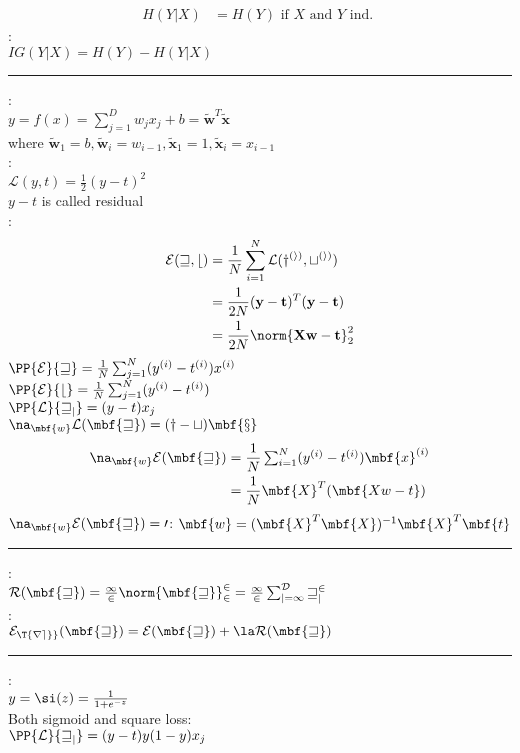 \documentclass[10pt]{CheatSheet/hw}
\begin{document}
\begin{multicols*}{5}
\begin{align*}
    H(Y|X)&=H(Y) \text{ if $X$ and $Y$ ind. }
\end{align*}
:\\ $IG(Y|X)=H(Y)-H(Y|X)$\\
\rule{\linewidth}{0.4pt}
:\\ $y=f(x)=\sum_{j=1}^D w_j x_j + b=\mathbf{\tilde{w}}^T\mathbf{\tilde{x}}$\\ where $\mathbf{\tilde{w}}_1=b,\mathbf{\tilde{w}}_i=w_{i-1}, \mathbf{\tilde{x}}_1=1, \mathbf{\tilde{x}}_i=x_{i-1}$\\
:\\ $\mathcal{L}(y,t)=\frac12(y-t)^2$\\$y-t$ is called residual\\
: \begin{align*}
    \cal{E}(w,b)&=\frac1N\sum_{i=1}^N \cal{L}(y^{(i)}, t^{(i)})\\
    &=\frac1{2N}(\mathbf{y}-\mathbf{t})^T(\mathbf{y}-\mathbf{t})\\
    &=\frac1{2N}\norm{\mathbf{Xw-t}}_2^2
\end{align*}
$\PP{\cal{E}}{w}=\frac1{N}\sum_{j=1}^N (y^{(i)}-t^{(i)})x^{(i)}$\\
$\PP{\cal{E}}{b}=\frac1{N}\sum_{j=1}^N (y^{(i)}-t^{(i)})$\\
$\PP{\cal{L}}{w_j}=(y-t)x_j$\\
$\na_\mbf{w} \cal{L}(\mbf{w}) = (y-t)\mbf{x}$
\begin{align*}
    \na_\mbf{w} \cal{E}(\mbf{w}) &= \frac1N \textstyle\sum_{i=1}^N (y^{(i)}-t^{(i)})\mbf{x}^{(i)}\\
    &= \frac1N \mbf{X}^T(\mbf{Xw-t})
\end{align*}
$\na_\mbf{w} \cal{E}(\mbf{w})=0$: $\mbf{w}=(\mbf{X}^T\mbf{X})^{-1}\mbf{X}^T\mbf{t}$\\
\rule{\linewidth}{0.4pt}
:\\ $\cal{R}(\mbf{w})=\frac12\norm{\mbf{w}}_2^2=\frac12\sum_{j=1}^D w_j^2$\\
:\\ $\cal{E}_{\T{reg}}(\mbf{w})=\cal{E}(\mbf{w})+\la\cal{R}(\mbf{w})$\\
\rule{\linewidth}{0.4pt}
:\\ $y=\si(z)=\frac1{1+e^{-z}}$\\
Both sigmoid and square loss:\\ $\PP{\cal{L}}{w_j}=(y-t)y(1-y)x_j$\\

\end{multicols*}
\end{document}
